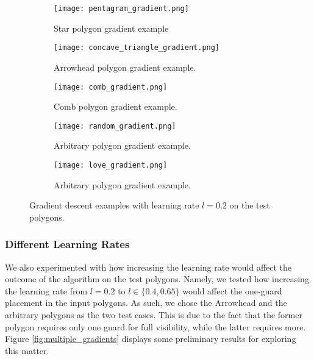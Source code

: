 \begin{figure}[h!]
    \centering
    \begin{subfigure}{0.45\textwidth}
        \centering
        \texttt{[image: pentagram\_gradient.png]}
        \caption{Star polygon gradient example}
        \label{fig:star_gradient}
    \end{subfigure}
    \begin{subfigure}{0.45\textwidth}
        \centering
        \texttt{[image: concave\_triangle\_gradient.png]}
        \caption{Arrowhead polygon gradient example.}
        \label{fig:concave_gradient}
    \end{subfigure}
    \begin{subfigure}{0.45\textwidth}
        \centering
        \texttt{[image: comb\_gradient.png]}
        \caption{Comb polygon gradient example.}
        \label{fig:comb_gradient}
    \end{subfigure}
    \begin{subfigure}{0.45\textwidth}
        \centering
        \texttt{[image: random\_gradient.png]}
        \caption{Arbitrary polygon gradient example.}
        \label{fig:random_gradient}
    \end{subfigure}
    \begin{subfigure}{\textwidth}
        \centering
        \texttt{[image: love\_gradient.png]}
        \caption{Arbitrary polygon gradient example.}
        \label{fig:love_gradient}
    \end{subfigure}
    \caption{Gradient descent examples with learning rate $l = 0.2$ on the test polygons.}
    \label{fig:gradients}
\end{figure}

\subsubsection{Different Learning Rates}
We also experimented with how increasing the learning rate would affect the outcome of the algorithm on the test polygons. Namely, we tested how increasing the learning rate from $l = 0.2$ to $l \in \{0.4, 0.65\}$ would affect the one-guard placement in the input polygons. As such, we chose the Arrowhead and the arbitrary polygons as the two test cases. This is due to the fact that the former polygon requires only one guard for full visibility, while the latter requires more. Figure \ref{fig:multiple_gradients} displays some preliminary results for exploring this matter. 

